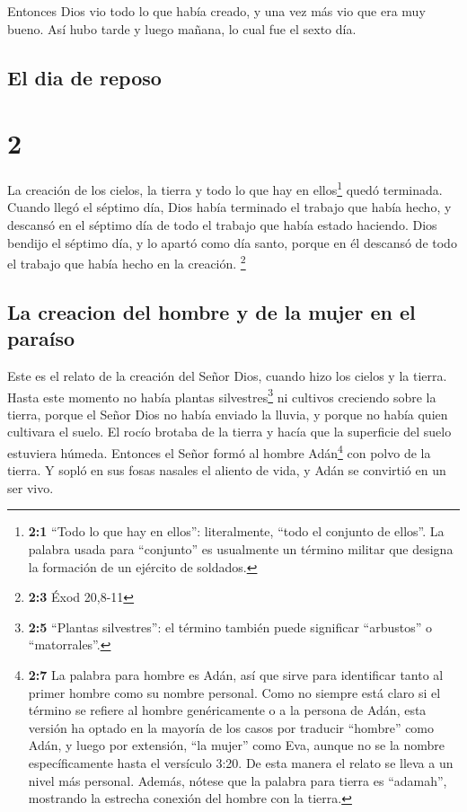  Entonces Dios vio todo lo que había creado, y una vez
más vio que era muy bueno. Así hubo tarde y luego mañana, lo cual fue el
sexto día.

\hypertarget{el-dia-de-reposo}{%
\subsection{El dia de reposo}\label{el-dia-de-reposo}}

\hypertarget{section-1}{%
\section{2}\label{section-1}}

 La creación de los cielos, la tierra y todo lo que hay en
ellos\footnote{\textbf{2:1} ``Todo lo que hay en ellos'': literalmente,
  ``todo el conjunto de ellos''. La palabra usada para ``conjunto'' es
  usualmente un término militar que designa la formación de un ejército
  de soldados.} quedó terminada.  Cuando llegó el séptimo
día, Dios había terminado el trabajo que había hecho, y descansó en el
séptimo día de todo el trabajo que había estado haciendo. 
Dios bendijo el séptimo día, y lo apartó como día santo, porque en él
descansó de todo el trabajo que había hecho en la creación. \footnote{\textbf{2:3}
  Éxod 20,8-11}

\hypertarget{la-creacion-del-hombre-y-de-la-mujer-en-el-parauxedso}{%
\subsection{La creacion del hombre y de la mujer en el
paraíso}\label{la-creacion-del-hombre-y-de-la-mujer-en-el-parauxedso}}

 Este es el relato de la creación del Señor Dios, cuando
hizo los cielos y la tierra.  Hasta este momento no había
plantas silvestres\footnote{\textbf{2:5} ``Plantas silvestres'': el
  término también puede significar ``arbustos'' o ``matorrales''.} ni
cultivos creciendo sobre la tierra, porque el Señor Dios no había
enviado la lluvia, y porque no había quien cultivara el suelo.
 El rocío brotaba de la tierra y hacía que la superficie
del suelo estuviera húmeda.  Entonces el Señor formó al
hombre Adán\footnote{\textbf{2:7} La palabra para hombre es Adán, así
  que sirve para identificar tanto al primer hombre como su nombre
  personal. Como no siempre está claro si el término se refiere al
  hombre genéricamente o a la persona de Adán, esta versión ha optado en
  la mayoría de los casos por traducir ``hombre'' como Adán, y luego por
  extensión, ``la mujer'' como Eva, aunque no se la nombre
  específicamente hasta el versículo 3:20. De esta manera el relato se
  lleva a un nivel más personal. Además, nótese que la palabra para
  tierra es ``adamah'', mostrando la estrecha conexión del hombre con la
  tierra.} con polvo de la tierra. Y sopló en sus fosas nasales el
aliento de vida, y Adán se convirtió en un ser vivo.

